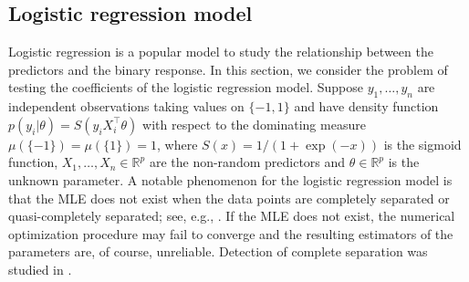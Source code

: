 \documentclass[11pt]{article}
\newcommand{\myT}{\intercal}
\theoremstyle{plain}
\theoremstyle{definition}
\theoremstyle{remark}
\begin{document}

\subsection{Logistic regression model}\label{sec:logistic}
Logistic regression is a popular model to study the relationship between the predictors and the binary response.
In this section, we consider the problem of testing the coefficients of the logistic regression model.
Suppose $y_1, \dots, y_n$ are independent observations taking values on $\{-1,1\}$ and have density function
    $p(y_i | \theta) = S(y_i X_i^\myT \theta)$
    with respect to the dominating measure $\mu(\{-1\}) = \mu(\{1\}) = 1$, where
    $S(x) = 1/(1+\exp(-x))$ is the sigmoid function,
    $X_1, \dots, X_n \in \mathbb R^p$ are the non-random predictors and $\theta \in \mathbb R^p$ is the unknown parameter.
    A notable phenomenon for the logistic regression model is that the MLE does not exist when the data points are completely separated or quasi-completely separated; see, e.g., \cite{Albert1984On,Candes2020The_phase}.
    If the MLE does not exist, the numerical optimization procedure may fail to converge and the resulting estimators of the parameters are, of course, unreliable.
    Detection of complete separation was studied in \cite{Lesaffre1989Partial}.
\end{document}
